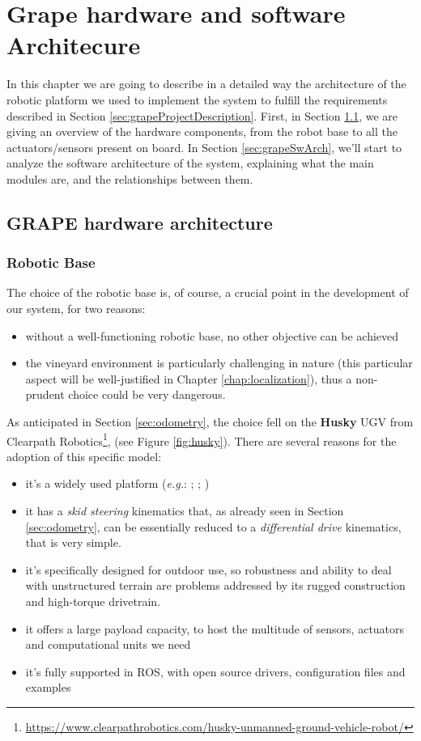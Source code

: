 
\chapter{Grape hardware and software Architecure} \label{chap:grapeSoftwareArchitecture}

In this chapter we are going to describe in a detailed way the architecture of the robotic platform we used to implement the system to fulfill the requirements described in Section \ref{sec:grapeProjectDescription}. First, in Section \ref{sec:grapeHwArch}, we are giving an overview of the hardware components, from the robot base to all the actuators/sensors present on board. In Section \ref{sec:grapeSwArch}, we'll start to analyze the software architecture of the system, explaining what the main modules are, and the relationships between them.

\section{GRAPE hardware architecture}\label{sec:grapeHwArch}

\subsection{Robotic Base}
The choice of the robotic base is, of course, a crucial point in the development of our system, for two reasons:
\begin{itemize}
	\item without a well-functioning robotic base, no other objective can be achieved
	\item the vineyard environment is particularly challenging in nature (this particular aspect will be well-justified in Chapter \ref{chap:localization}), thus a non-prudent choice could be very dangerous.
\end{itemize}
As anticipated in Section \ref{sec:odometry}, the choice fell on the \textbf{Husky} \ac{UGV} from Clearpath Robotics\footnote{\url{https://www.clearpathrobotics.com/husky-unmanned-ground-vehicle-robot/}},
(see Figure \ref{fig:husky}). There are several reasons for the adoption of this specific model:
\begin{itemize}
	\item it's a widely used platform (\textit{e.g.}: \cite{husky1}; \cite{husky2}; \cite{husky3})
	\item it has a \textit{skid steering} kinematics that, as already seen in Section \ref{sec:odometry}, can be essentially reduced to a \textit{differential drive} kinematics, that is very simple.
	\item it's specifically designed for outdoor use, so robustness and ability to deal with unstructured terrain are problems addressed by its rugged construction and high-torque drivetrain.
	\item it offers a large payload capacity, to host the multitude of sensors, actuators and computational units we need
	\item it's fully supported in \ac{ROS}, with open source drivers, configuration files and examples
\end{itemize}

